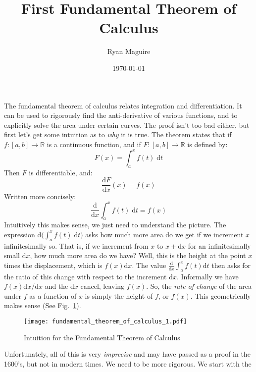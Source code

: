\documentclass{article}
\title{First Fundamental Theorem of Calculus}
\author{Ryan Maguire}
\date{\today}
\theoremstyle{plain}
\begin{document}
    \maketitle
    The fundamental theorem of calculus relates integration and differentiation.
    It can be used to rigorously find the anti-derivative of various functions,
    and to explicitly solve the area under certain curves. The proof isn't too
    bad either, but first let's get some intuition as to \textit{why} it is
    true. The theorem states that if $f:[a,b]\rightarrow\mathbb{R}$ is a
    continuous function, and if $F:[a,b]\rightarrow\mathbb{R}$ is defined by:
    \begin{equation}
        F(x)=\int_{a}^{x}f(t)\;\textrm{d}t
    \end{equation}
    Then $F$ is differentiable, and:
    \begin{equation}
        \frac{\textrm{d}F}{\textrm{d}x}(x)=f(x)
    \end{equation}
    Written more concisely:
    \begin{equation}
        \frac{\textrm{d}}{\textrm{d}x}\int_{a}^{x}f(t)\;\textrm{d}t=f(x)
    \end{equation}
    Intuitively this makes sense, we just need to understand the picture.
    The expression $\textrm{d}\big(\int_{a}^{x}f(t)\;\textrm{d}t\big)$
    asks how much more
    area do we get if we increment $x$ infinitesimally so. That is, if we
    increment from $x$ to $x+\textrm{d}x$ for an infinitesimally small
    $\textrm{d}x$, how much more area do we have? Well, this is the height at
    the point $x$ times the displacement, which is $f(x)\textrm{d}x$. The value
    $\frac{\textrm{d}}{\textrm{d}x}\int_{a}^{x}f(t)\textrm{d}t$ then asks for
    the ratio of this change with respect to the increment $\textrm{d}x$.
    Informally we have $f(x)\textrm{d}x/\textrm{d}x$ and the $\textrm{d}x$
    cancel, leaving $f(x)$. So, the \textit{rate of change} of the area under
    $f$ as a function of $x$ is simply the height of $f$, or $f(x)$. This
    geometrically makes sense (See Fig.~\ref{fig:intuition}).
    \begin{figure}
        \centering
        \texttt{[image: fundamental\_theorem\_of\_calculus\_1.pdf]}
        \caption{Intuition for the Fundamental Theorem of Calculus}
        \label{fig:intuition}
    \end{figure}
    Unfortunately, all of this is very
    \textit{imprecise} and may have passed as a proof in the 1600's, but not
    in modern times. We need to be more rigorous. We start with the
\end{document}

